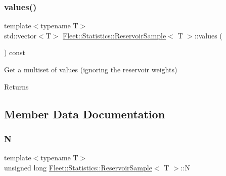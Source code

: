 \subsubsection{\texorpdfstring{values()}{values()}}
{\footnotesize\ttfamily template$<$typename T$>$ \\
std\+::vector$<$T$>$ \hyperlink{class_fleet_1_1_statistics_1_1_reservoir_sample}{Fleet\+::\+Statistics\+::\+Reservoir\+Sample}$<$ T $>$\+::values (\begin{DoxyParamCaption}{ }\end{DoxyParamCaption}) const\hspace{0.3cm}{\ttfamily [inline]}}



Get a multiset of values (ignoring the reservoir weights) 

\begin{DoxyReturn}{Returns}

\end{DoxyReturn}


\subsection{Member Data Documentation}
\mbox{\label{class_fleet_1_1_statistics_1_1_reservoir_sample_a1e0c5104f173107e23900ff707df05ab}} 
\subsubsection{\texorpdfstring{N}{N}}
{\footnotesize\ttfamily template$<$typename T$>$ \\
unsigned long \hyperlink{class_fleet_1_1_statistics_1_1_reservoir_sample}{Fleet\+::\+Statistics\+::\+Reservoir\+Sample}$<$ T $>$\+::N}

\mbox{\label{class_fleet_1_1_statistics_1_1_reservoir_sample_a94ccb7246b63257eeee446ab4574387a}} 
